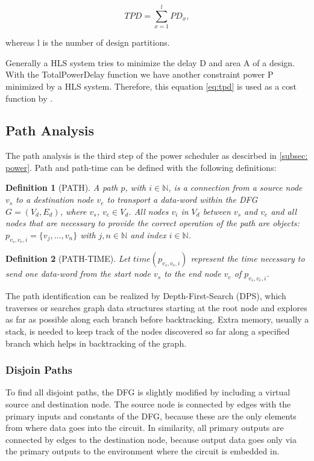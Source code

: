 \documentclass[conference]{IEEEtran}
\newtheorem{definition}{Definition}
\begin{document}
\begin{equation}
TPD = \sum_{x=1}^{l} PD_x,
\label{eq:tpd}
\end{equation}

whereas l is the number of design partitions.

Generally a HLS system tries to minimize the delay D and area A of a design. With the TotalPowerDelay function we have another constraint power P minimized by a HLS system. Therefore, this equation \ref{eq:tpd} is used as a cost function by \cite{Ret}.


\subsection{Path Analysis}
\label{subsec: path analysis}
The path analysis is the third step of the power scheduler as descirbed in \ref{subsec: power}. Path and path-time can be defined with the following definitions:

\begin{definition}[PATH]
\label{def:cfg}
A path $p$, with $i \in \mathbb{N}$, is a connection from a source node $v_s$ to a destination node $v_e$ to transport a data-word within the DFG $G = (V_d, E_d)$, where $v_s$, $v_e \in V_d$. All nodes $v_i$ in $V_d$ between $v_s$ and $v_e$ and all nodes that are necessary to provide the correct operation of the path are objects: $p_{v_s,v_e,i} = \{v_j, \ldots, v_n\}$ with $j, n \in \mathbb{N}$ and index $i \in \mathbb{N}$.
\end{definition}

\begin{definition}[PATH-TIME]
Let $time(p_{v_s,v_e,i})$ represent the time necessary to send one data-word from the start node $v_s$ to the end node $v_e$ of $p_{v_s,v_e,i}$.
\end{definition}

The path identification can be realized by Depth-First-Search (DPS), which traverses or searches graph data structures starting at the root node and explores as far as possible along each branch before backtracking. Extra memory, usually a stack, is needed to keep track of the nodes discovered so far along a specified branch which helps in backtracking of the graph.


\subsubsection{Disjoin Paths}
To find all disjoint paths, the DFG is slightly modified by including a virtual source and destination node. The source node is connected by edges with the primary inputs and constants of the DFG, because these are the only elements from where data goes into the circuit. In similarity, all primary outputs are connected by edges to the destination node, because output data goes only via the primary outputs to the environment where the circuit is embedded in. 
\end{document}
